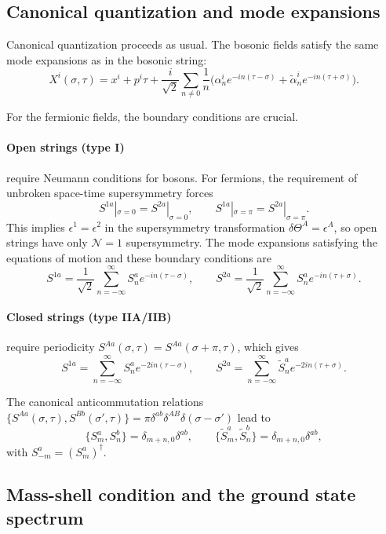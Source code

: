 \documentclass[12pt]{article}
\begin{document}
\subsection{Canonical quantization and mode expansions}

Canonical quantization proceeds as usual. The bosonic fields satisfy the same mode expansions as in the bosonic string:
\[
X^{i}(\sigma,\tau)=x^{i}+p^{i}\tau+\frac{i}{\sqrt{2}}\sum_{n\neq0}\frac{1}{n}\bigl(\alpha_{n}^{i}e^{-in(\tau-\sigma)}+\tilde{\alpha}_{n}^{i}e^{-in(\tau+\sigma)}\bigr).
\]

For the fermionic fields, the boundary conditions are crucial. 

\paragraph{Open strings (type I)} require Neumann conditions for bosons. For fermions, the requirement of unbroken space-time supersymmetry forces
\[
S^{1a}|_{\sigma=0}=S^{2a}|_{\sigma=0},\qquad S^{1a}|_{\sigma=\pi}=S^{2a}|_{\sigma=\pi}.
\]
This implies $\epsilon^{1}=\epsilon^{2}$ in the supersymmetry transformation $\delta\Theta^{A}=\epsilon^{A}$, so open strings have only $\mathcal{N}=1$ supersymmetry. The mode expansions satisfying the equations of motion and these boundary conditions are
\[
S^{1a}=\frac{1}{\sqrt{2}}\sum_{n=-\infty}^{\infty}S_{n}^{a}e^{-in(\tau-\sigma)},\qquad
S^{2a}=\frac{1}{\sqrt{2}}\sum_{n=-\infty}^{\infty}S_{n}^{a}e^{-in(\tau+\sigma)}.
\]

\paragraph{Closed strings (type IIA/IIB)} require periodicity $S^{Aa}(\sigma,\tau)=S^{Aa}(\sigma+\pi,\tau)$, which gives
\[
S^{1a}=\sum_{n=-\infty}^{\infty}S_{n}^{a}e^{-2in(\tau-\sigma)},\qquad
S^{2a}=\sum_{n=-\infty}^{\infty}\tilde{S}_{n}^{a}e^{-2in(\tau+\sigma)}.
\]

The canonical anticommutation relations $\{S^{Aa}(\sigma,\tau),S^{Bb}(\sigma',\tau)\}=\pi\delta^{ab}\delta^{AB}\delta(\sigma-\sigma')$ lead to
\[
\{S_{m}^{a},S_{n}^{b}\}=\delta_{m+n,0}\delta^{ab},\qquad \{\tilde{S}_{m}^{a},\tilde{S}_{n}^{b}\}=\delta_{m+n,0}\delta^{ab},
\]
with $S_{-m}^{a}=(S_{m}^{a})^{\dagger}$.

\subsection{Mass-shell condition and the ground state spectrum}
\end{document}
